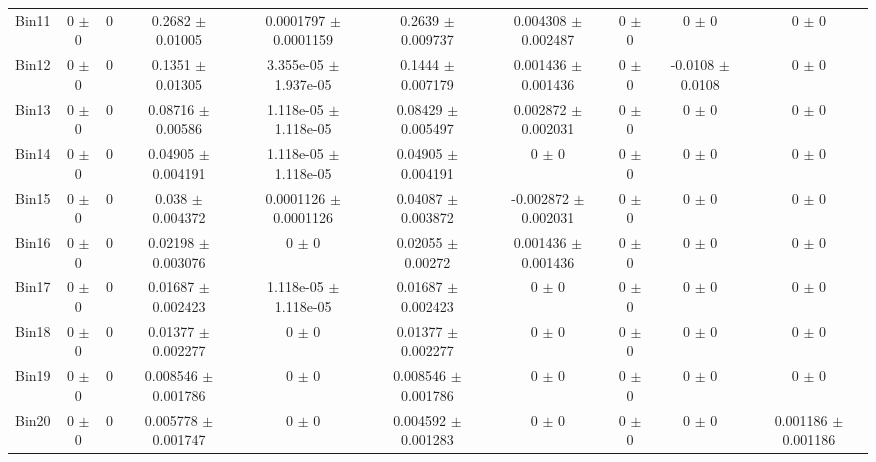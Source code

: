 \begin{tabular}{@{\extracolsep{4pt}}lccccccccc@{}}
     Bin11 & 0 $\pm$ 0 & 0 & 0.2682 $\pm$ 0.01005 & 0.0001797 $\pm$ 0.0001159 & 0.2639 $\pm$ 0.009737 & 0.004308 $\pm$ 0.002487 & 0 $\pm$ 0 & 0 $\pm$ 0 & 0 $\pm$ 0 \\ 
     Bin12 & 0 $\pm$ 0 & 0 & 0.1351 $\pm$ 0.01305 & 3.355e-05 $\pm$ 1.937e-05 & 0.1444 $\pm$ 0.007179 & 0.001436 $\pm$ 0.001436 & 0 $\pm$ 0 & -0.0108 $\pm$ 0.0108 & 0 $\pm$ 0 \\ 
     Bin13 & 0 $\pm$ 0 & 0 & 0.08716 $\pm$ 0.00586 & 1.118e-05 $\pm$ 1.118e-05 & 0.08429 $\pm$ 0.005497 & 0.002872 $\pm$ 0.002031 & 0 $\pm$ 0 & 0 $\pm$ 0 & 0 $\pm$ 0 \\ 
     Bin14 & 0 $\pm$ 0 & 0 & 0.04905 $\pm$ 0.004191 & 1.118e-05 $\pm$ 1.118e-05 & 0.04905 $\pm$ 0.004191 & 0 $\pm$ 0 & 0 $\pm$ 0 & 0 $\pm$ 0 & 0 $\pm$ 0 \\ 
     Bin15 & 0 $\pm$ 0 & 0 & 0.038 $\pm$ 0.004372 & 0.0001126 $\pm$ 0.0001126 & 0.04087 $\pm$ 0.003872 & -0.002872 $\pm$ 0.002031 & 0 $\pm$ 0 & 0 $\pm$ 0 & 0 $\pm$ 0 \\ 
     Bin16 & 0 $\pm$ 0 & 0 & 0.02198 $\pm$ 0.003076 & 0 $\pm$ 0 & 0.02055 $\pm$ 0.00272 & 0.001436 $\pm$ 0.001436 & 0 $\pm$ 0 & 0 $\pm$ 0 & 0 $\pm$ 0 \\ 
     Bin17 & 0 $\pm$ 0 & 0 & 0.01687 $\pm$ 0.002423 & 1.118e-05 $\pm$ 1.118e-05 & 0.01687 $\pm$ 0.002423 & 0 $\pm$ 0 & 0 $\pm$ 0 & 0 $\pm$ 0 & 0 $\pm$ 0 \\ 
     Bin18 & 0 $\pm$ 0 & 0 & 0.01377 $\pm$ 0.002277 & 0 $\pm$ 0 & 0.01377 $\pm$ 0.002277 & 0 $\pm$ 0 & 0 $\pm$ 0 & 0 $\pm$ 0 & 0 $\pm$ 0 \\ 
     Bin19 & 0 $\pm$ 0 & 0 & 0.008546 $\pm$ 0.001786 & 0 $\pm$ 0 & 0.008546 $\pm$ 0.001786 & 0 $\pm$ 0 & 0 $\pm$ 0 & 0 $\pm$ 0 & 0 $\pm$ 0 \\ 
     Bin20 & 0 $\pm$ 0 & 0 & 0.005778 $\pm$ 0.001747 & 0 $\pm$ 0 & 0.004592 $\pm$ 0.001283 & 0 $\pm$ 0 & 0 $\pm$ 0 & 0 $\pm$ 0 & 0.001186 $\pm$ 0.001186 \\ 
\hline\hline
  \end{tabular}
